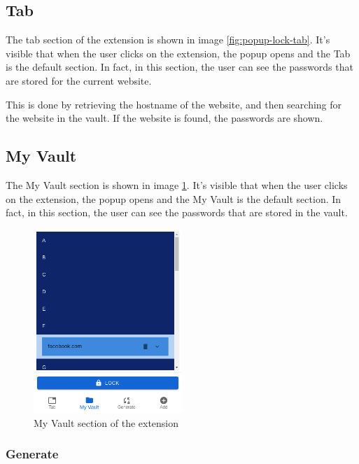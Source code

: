 \subsection {Tab}

The tab section of the extension is shown in image \ref{fig:popup-lock-tab}. It's visible that when the user clicks on the extension, the popup opens and the Tab is the default section. In fact, in this section, the user can see the passwords that are stored for the current website.

This is done by retrieving the hostname of the website, and then searching for the website in the vault. If the website is found, the passwords are shown.

\subsection {My Vault}

The My Vault section is shown in image \ref{fig:my-vault}. It's visible that when the user clicks on the extension, the popup opens and the My Vault is the default section. In fact, in this section, the user can see the passwords that are stored in the vault.
\begin{figure}[h!]
    \centering
    \vspace{0.5cm}
    \includegraphics[width=0.5\textwidth]{images/extension/my-vault.png}
    \caption{My Vault section of the extension}
    \label{fig:my-vault} %
\end{figure}

\subsubsection{Generate}

